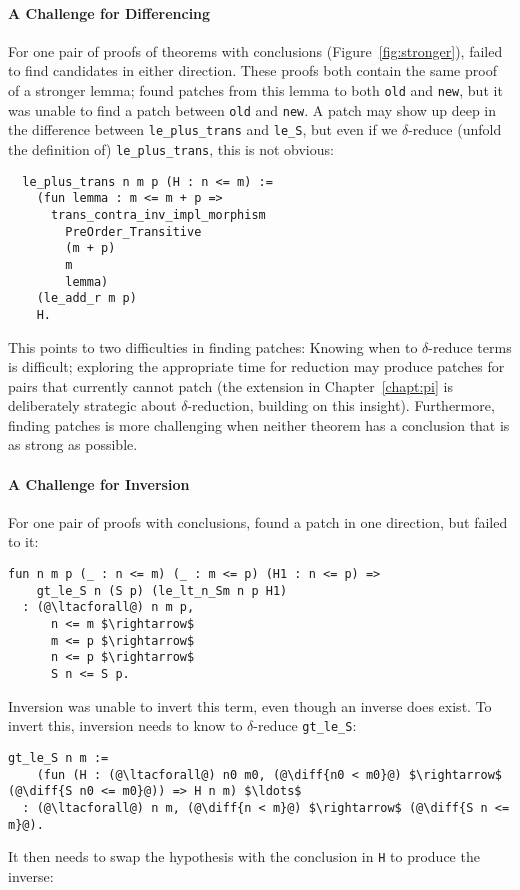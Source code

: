 \paragraph{A Challenge for Differencing} For one pair of proofs of theorems 
with  conclusions (Figure~\ref{fig:stronger}),
 failed to find candidates in either direction.
These proofs both contain the same proof of a stronger lemma;
\sysname found patches from this lemma to
both \lstinline{old} and \lstinline{new},
but it was unable to find a patch between \lstinline{old} and \lstinline{new}.
A patch may show up deep in the difference between \lstinline{le_plus_trans}
and \lstinline{le_S}, but even if we $\delta$-reduce (unfold the definition of) \lstinline{le_plus_trans}, this is not obvious:

\begin{lstlisting}
  le_plus_trans n m p (H : n <= m) :=
    (fun lemma : m <= m + p =>
      trans_contra_inv_impl_morphism
        PreOrder_Transitive
        (m + p)
        m
        lemma)
    (le_add_r m p)
    H.
\end{lstlisting}
This points to two difficulties in finding patches: Knowing when to $\delta$-reduce terms 
is difficult; exploring the appropriate time for reduction
may produce patches for pairs that \sysname currently cannot patch
(the \toolnamec extension in Chapter~\ref{chapt:pi} is deliberately strategic about $\delta$-reduction,
building on this insight).
Furthermore, finding patches is more challenging
when neither theorem has a conclusion that is as strong as possible.

\paragraph{A Challenge for Inversion} For one pair of proofs with  conclusions,
\sysname found a patch in one direction, but failed to  it:

\begin{lstlisting}[language=coq]
  fun n m p (_ : n <= m) (_ : m <= p) (H1 : n <= p) =>
    gt_le_S n (S p) (le_lt_n_Sm n p H1)
  : (@\ltacforall@) n m p,
      n <= m $\rightarrow$
      m <= p $\rightarrow$
      n <= p $\rightarrow$
      S n <= S p.
\end{lstlisting}
Inversion was unable to invert this term, even though an inverse does exist.
To invert this, inversion needs to know to $\delta$-reduce \lstinline{gt_le_S}:

\begin{lstlisting}[language=coq]
  gt_le_S n m :=
    (fun (H : (@\ltacforall@) n0 m0, (@\diff{n0 < m0}@) $\rightarrow$ (@\diff{S n0 <= m0}@)) => H n m) $\ldots$
  : (@\ltacforall@) n m, (@\diff{n < m}@) $\rightarrow$ (@\diff{S n <= m}@).
\end{lstlisting}
It then needs to swap the hypothesis with the conclusion in \lstinline{H} to produce the inverse:

